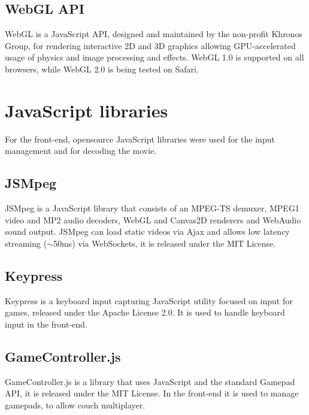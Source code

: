 \subsection{WebGL API}
WebGL is a JavaScript API, designed and maintained by the non-profit Khronos Group, for rendering interactive 2D and 3D graphics allowing GPU-accelerated usage of physics and image processing and effects. WebGL 1.0 is supported on all browsers, while WebGL 2.0 is being tested on Safari\cite{WebGL}.



\section{JavaScript libraries}
For the front-end, opensource JavaScript libraries were used for the input management and for decoding the movie.

\subsection{JSMpeg}
JSMpeg is a JavaScript library that consists of an MPEG-TS demuxer, MPEG1 video and MP2 audio decoders, WebGL and Canvas2D renderers and WebAudio sound output. JSMpeg can load static videos via Ajax and allows low latency streaming ($\sim$50ms) via WebSockets, it is released under the MIT License\cite{JSMpeg}.

\subsection{Keypress}
Keypress is a keyboard input capturing JavaScript utility focused on input for games, released under the Apache License 2.0. It is used to handle keyboard input in the front-end\cite{Keypress}.

\subsection{GameController.js}
GameController.js is a library that uses JavaScript and the standard Gamepad API, it is released under the MIT License. In the front-end it is used to manage gamepads, to allow couch multiplayer\cite{gameController_js}.